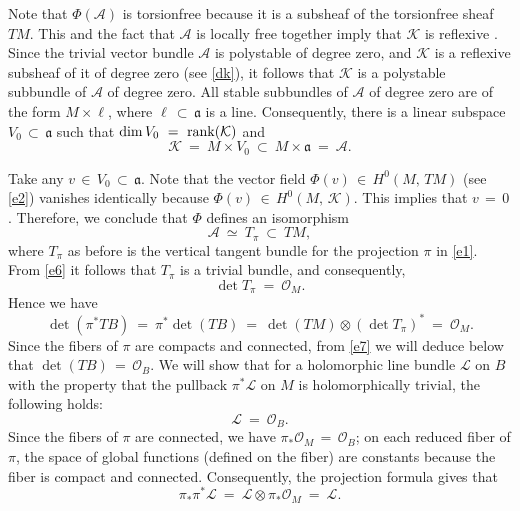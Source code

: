 \documentclass[12pt,reqno]{amsart}
\theoremstyle{definition}
\numberwithin{equation}{section}
\begin{document}
Note that $\Phi(\mathcal A)$ is torsionfree because it is a subsheaf of the torsionfree sheaf $TM$. This 
and the fact that $\mathcal A$ is locally free together imply that $\mathcal K$ is reflexive \cite[Ch.~V, 
p.~153, Proposition 4.13]{Ko}. Since the trivial vector bundle $\mathcal A$ is polystable of degree zero, 
and $\mathcal K$ is a reflexive subsheaf of it of degree zero (see \eqref{dk}), it follows that $\mathcal 
K$ is a polystable subbundle of $\mathcal A$ of degree zero. All stable subbundles of $\mathcal A$ of 
degree zero are of the form $M\times \ell$, where $\ell\, \subset\, {\mathfrak a}$ is a line. Consequently, 
there is a linear subspace $V_0\, \subset\, {\mathfrak a}$ such that $\dim V_0\ =\ {\rm rank}({\mathcal 
K})$ and
$$
{\mathcal K}\ =\ M\times V_0\ \subset\ M\times {\mathfrak a}\ =\ {\mathcal A}.
$$

Take any $v\, \in\, V_0\, \subset\, {\mathfrak a}$. Note that the vector field $\Phi(v)\,\in\, H^0(M,\, 
TM)$ (see \eqref{e2}) vanishes identically because $\Phi(v)\,\in\, H^0(M,\, {\mathcal K})$. This implies 
that $v\,=\, 0$. Therefore, we conclude that $\Phi$ defines an isomorphism
\begin{equation}\label{e6}
{\mathcal A}\ \simeq \ T_\pi \ \subset\ TM,
\end{equation}
where $T_\pi$ as before is the vertical tangent bundle for the projection $\pi$ in \eqref{e1}. From
\eqref{e6} it follows that $T_\pi$ is a trivial bundle, and consequently,
$$\det T_\pi\ =\ {\mathcal O}_M .$$
Hence we have
\begin{equation}\label{e7}
\det (\pi^*TB)\ =\ \pi^*\det (TB) \ =\ \det (TM)\otimes (\det T_\pi)^* \ =\ {\mathcal O}_M.
\end{equation}
Since the fibers of $\pi$ are compacts and  connected, from \eqref{e7} we will deduce below 
that $\det (TB)\,=\, {\mathcal O}_B$.  We will show that for a holomorphic line
bundle $\mathcal L$ on
$B$ with the property that the pullback $\pi^* {\mathcal L}$ on $M$ is holomorphically trivial, the following
holds:
\begin{equation}\label{rs}
{\mathcal L} \ =\ {\mathcal O}_B.
\end{equation}
Since the fibers of $\pi$ are  connected, we  have  $\pi_*{\mathcal O}_M\,=\, {\mathcal O}_B$; on each
reduced fiber of $\pi$, the space of global functions (defined on the fiber) are constants because the fiber
is compact and connected. Consequently, the projection formula gives that
$$
\pi_*\pi^*{\mathcal L}\ =\ {\mathcal L}\otimes \pi_*{\mathcal O}_M\ =\ {\mathcal L}.
$$
\end{document}
